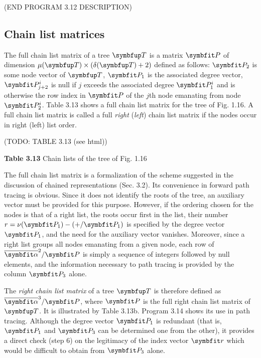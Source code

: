 \par (END PROGRAM 3.12 DESCRIPTION)

\subsection*{Chain list matrices}

\par The full chain list matrix of a tree $\tree{T}$ is a matrix $\mat{P}$ of dimension $\mu(\tree{T}) \times (\delta(\tree{T}) + 2)$ defined as follows: $\mat{P}_2$ is some node vector of $\tree{T}$, $\mat{P}_1$ is the associated degree vector, $\mat{P}_{j+2}^i$ is null if $j$ exceeds the associated degree $\mat{P}_1^i$ and is otherwise the row index in $\mat{P}$ of the $j$th node emanating from node $\mat{P}_2^i$. Table 3.13 shows a full chain list matrix for the tree of Fig. 1.16. A full chain list matrix is called a full \textit{right} (\textit{left}) chain list matrix if the nodes occur in right (left) list order.

\par (TODO: TABLE 3.13 (see html))

\par \textbf{Table 3.13} Chain lists of the tree of Fig. 1.16

\par The full chain list matrix is a formalization of the scheme suggested in the discussion of chained representations (Sec. 3.2). Its convenience in forward path tracing is obvious. Since it does not identify the roots of the tree, an auxiliary vector must be provided for this purpose. However, if the ordering chosen for the nodes is that of a right list, the roots occur first in the list, their number $r = \nu(\mat{P}_1) - (+/\mat{P}_1)$ is specified by the degree vector $\mat{P}_1$, and the need for the auxiliary vector vanishes. Moreover, since a right list groups all nodes emanating from a given node, each row of $\overline{\vect{\alpha}}^2/\mat{P}$ is simply a sequence of integers followed by null elements, and the information necessary to path tracing is provided by the column $\mat{P}_3$ alone.

\par The \textit{right chain list matrix} of a tree $\tree{T}$ is therefore defined as $\overline{\vect{\alpha}}^3/\mat{P}$, where $\mat{P}$ is the full right chain list matrix of $\tree{T}$. It is illustrated by Table 3.13b. Program 3.14 shows its use in path tracing. Although the degree vector $\mat{P}_1$ is redundant (that is, $\mat{P}_1$ and $\mat{P}_3$ can be determined one from the other), it provides a direct check (step 6) on the legitimacy of the index vector $\vect{r}$ which would be difficult to obtain from $\mat{P}_3$ alone.

